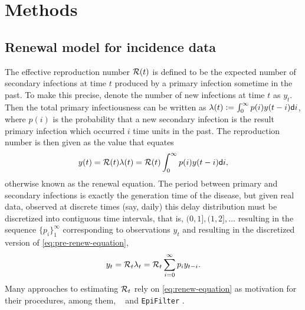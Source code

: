 \section{Methods}

\subsection{Renewal model for incidence data} 

The effective reproduction number $\mathcal{R}(t)$
is defined to be the expected number of secondary infections at time $t$
produced by a primary infection sometime in the past.
To make this precise, denote the number
of new infections at time $t$ as $y_t$. Then the total primary
infectiousness can be written as $\lambda(t) := \int_0^{\infty} p(i) y(t-i)
\mathsf{d} i$,
where $p(i)$ is the probability that a new secondary infection is the result
primary infection which occurred $i$ time units in the past. 
The reproduction number is
then given as the value that equates
\begin{equation} \label{eq:pre-renew-equation}
  y(t) = \mathcal{R}(t)\lambda(t) = \mathcal{R}(t)\int_0^\infty p(i)y(t-i)\mathsf{d} i,
\end{equation}
otherwise known as the renewal equation. 
The period between primary and secondary
infections is exactly the generation time of the disease, but given real data,
observed at discrete times (say, daily) this delay distribution must be discretized
into contiguous time intervals,
that is, $(0,1], (1,2], \dots$ resulting in the sequence $\{p_i\}_1^\infty$
corresponding to observations $y_t$ and resulting in the
discretized version of \eqref{eq:pre-renew-equation},
\begin{equation} \label{eq:renew-equation}
  y_t = \mathcal{R}_t\lambda_t = \mathcal{R}_t\sum_{i = 0}^\infty p_i y_{t-i}.
\end{equation}
Many approaches to estimating $\mathcal{R}_t$ rely on \eqref{eq:renew-equation} as
motivation for their procedures, among them,
\EpiEstim\ \citep{cori2013new} and \texttt{EpiFilter}
\citep{parag2021improved}. 

